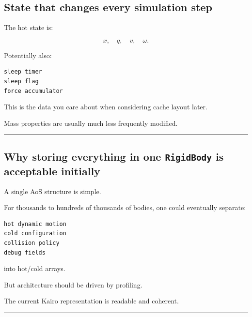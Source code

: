 \subsection{State that changes every simulation step}\label{06-engine-ii-ch037-state-that-changes-every-simulation-step}

\hypertarget{06-engine-ii-ch037-state-that-changes-every-simulation-step}{}

The hot state is:

\[
x,\quad q,\quad v,\quad\omega.
\]

Potentially also:

\begin{verbatim}
sleep timer
sleep flag
force accumulator
\end{verbatim}

This is the data you care about when considering cache layout later.

Mass properties are usually much less frequently modified.

\begin{center}\rule{0.5\linewidth}{0.5pt}\end{center}

\subsection{\texorpdfstring{Why storing everything in one \texttt{RigidBody} is acceptable initially}{Why storing everything in one RigidBody is acceptable initially}}\label{06-engine-ii-ch037-why-storing-everything-in-one-rigidbody-is-acceptable-initially}

\hypertarget{06-engine-ii-ch037-why-storing-everything-in-one-rigidbody-is-acceptable-initially}{}

A single AoS structure is simple.

For thousands to hundreds of thousands of bodies, one could eventually separate:

\begin{verbatim}
hot dynamic motion
cold configuration
collision policy
debug fields
\end{verbatim}

into hot/cold arrays.

But architecture should be driven by profiling.

The current Kairo representation is readable and coherent.

\begin{center}\rule{0.5\linewidth}{0.5pt}\end{center}

